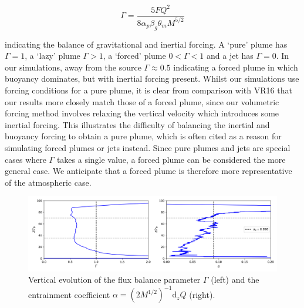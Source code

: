 \documentclass[a4paper]{article}
\begin{document}
\begin{equation}
	\Gamma = \frac{5FQ^2}{8\alpha_p \beta_g \theta_m M^{5/2}}
	\label{eq:rich}
\end{equation}

indicating the balance of gravitational and inertial forcing. A `pure' plume has $\Gamma = 1$, a `lazy' plume
$\Gamma > 1$, a `forced' plume $0 < \Gamma < 1$ and a jet has $\Gamma = 0$. In our simulations, away from the
source $\Gamma \approx 0.5$ indicating a forced plume in which buoyancy dominates, but with inertial forcing
present. Whilst our simulations use forcing conditions for a pure plume, it is clear from comparison with VR16
that our results more closely match those of a forced plume, since our volumetric forcing method involves
relaxing the vertical velocity which introduces some inertial forcing. This illustrates the difficulty of
balancing the inertial and buoyancy forcing to obtain a pure plume, which is often cited as a reason for
simulating forced plumes or jets instead. Since pure plumes and jets are special cases where $\Gamma$ takes a
single value, a forced plume can be considered the more general case. We anticipate that a forced plume is
therefore more representative of the atmospheric case.

\begin{figure}
	\centering
	\includegraphics[width=\textwidth]{mvr/fig8}
	\caption{Vertical evolution of the flux balance parameter $\Gamma$ (left) and the entrainment coefficient
	$\alpha = (2M^{1/2})^{-1} \mathrm{d}_z Q$ (right).}
	\label{fig:entrain}
\end{figure}
\end{document}
